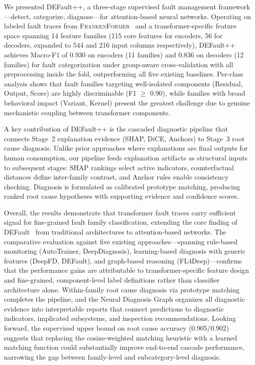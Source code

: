 We presented DEFault++, a three-stage supervised fault management framework---detect, categorize, diagnose---for attention-based neural networks. Operating on labeled fault traces from \textsc{FrankenFormer}~\cite{frankenformer} and a transformer-specific feature space spanning 14 feature families (115 core features for encoders, 56 for decoders, expanded to 544 and 216 input columns respectively), DEFault++ achieves Macro-F1 of 0.930 on encoders (11 families) and 0.836 on decoders (12 families) for fault categorization under group-aware cross-validation with all preprocessing inside the fold, outperforming all five existing baselines. Per-class analysis shows that fault families targeting well-isolated components (Residual, Output, Score) are highly discriminable (F1 $\geq$ 0.90), while families with broad behavioral impact (Variant, Kernel) present the greatest challenge due to genuine mechanistic coupling between transformer components.

A key contribution of DEFault++ is the cascaded diagnostic pipeline that connects Stage~2 explanation evidence (SHAP, DiCE, Anchors) to Stage~3 root cause diagnosis. Unlike prior approaches where explanations are final outputs for human consumption, our pipeline feeds explanation artifacts as structural inputs to subsequent stages: SHAP rankings select active indicators, counterfactual distances define inter-family contrast, and Anchor rules enable consistency checking. Diagnosis is formulated as calibrated prototype matching, producing ranked root cause hypotheses with supporting evidence and confidence scores.

Overall, the results demonstrate that transformer fault traces carry sufficient signal for fine-grained fault family classification, extending the core finding of DEFault~\cite{default} from traditional architectures to attention-based networks. The comparative evaluation against five existing approaches---spanning rule-based monitoring (AutoTrainer, DeepDiagnosis), learning-based diagnosis with generic features (DeepFD, DEFault), and graph-based reasoning (FL4Deep)---confirms that the performance gains are attributable to transformer-specific feature design and fine-grained, component-level label definitions rather than classifier architecture alone. Within-family root cause diagnosis via prototype matching completes the pipeline, and the Neural Diagnosis Graph organizes all diagnostic evidence into interpretable reports that connect predictions to diagnostic indicators, implicated subsystems, and inspection recommendations. Looking forward, the supervised upper bound on root cause accuracy (0.905/0.902) suggests that replacing the cosine-weighted matching heuristic with a learned matching function could substantially improve end-to-end cascade performance, narrowing the gap between family-level and subcategory-level diagnosis.
